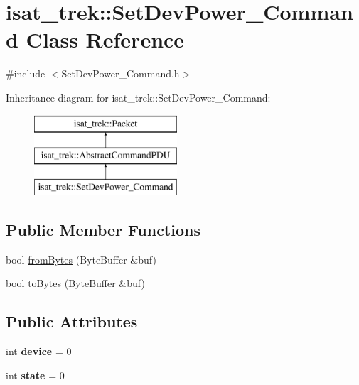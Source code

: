 \hypertarget{classisat__trek_1_1_set_dev_power___command}{}\section{isat\+\_\+trek\+:\+:Set\+Dev\+Power\+\_\+\+Command Class Reference}
\label{classisat__trek_1_1_set_dev_power___command}


{\ttfamily \#include $<$Set\+Dev\+Power\+\_\+\+Command.\+h$>$}

Inheritance diagram for isat\+\_\+trek\+:\+:Set\+Dev\+Power\+\_\+\+Command\+:\begin{figure}[H]
\begin{center}
\leavevmode
\includegraphics[height=3.000000cm]{classisat__trek_1_1_set_dev_power___command}
\end{center}
\end{figure}
\subsection*{Public Member Functions}
\begin{DoxyCompactItemize}
\item 
bool \hyperlink{classisat__trek_1_1_set_dev_power___command_a4bf3fb3a3f5ae96634935e37182a900e}{from\+Bytes} (Byte\+Buffer \&buf)
\item 
bool \hyperlink{classisat__trek_1_1_set_dev_power___command_a96f838bf99fc8bcaa50f89c4868f1a12}{to\+Bytes} (Byte\+Buffer \&buf)
\end{DoxyCompactItemize}
\subsection*{Public Attributes}
\begin{DoxyCompactItemize}
\item 
int {\bfseries device} = 0\hypertarget{classisat__trek_1_1_set_dev_power___command_a646ab0683c14bea03dd060393b28c950}{}\label{classisat__trek_1_1_set_dev_power___command_a646ab0683c14bea03dd060393b28c950}

\item 
int {\bfseries state} = 0\hypertarget{classisat__trek_1_1_set_dev_power___command_a07c22aedc9cd729659ec313699329129}{}\label{classisat__trek_1_1_set_dev_power___command_a07c22aedc9cd729659ec313699329129}

\end{DoxyCompactItemize}


